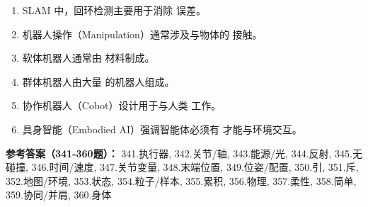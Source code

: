 \begin{enumerate}[resume,leftmargin=2em,itemsep=1pt]
\item SLAM 中，回环检测主要用于消除 \underline{\hspace{3em}} 误差。
\item 机器人操作（Manipulation）通常涉及与物体的 \underline{\hspace{3em}} 接触。
\item 软体机器人通常由 \underline{\hspace{3em}} 材料制成。
\item 群体机器人由大量 \underline{\hspace{3em}} 的机器人组成。
\item 协作机器人（Cobot）设计用于与人类 \underline{\hspace{3em}} 工作。
\item 具身智能（Embodied AI）强调智能体必须有 \underline{\hspace{3em}} 才能与环境交互。
\end{enumerate}

\textbf{参考答案（341-360题）：}
341.执行器, 342.关节/轴, 343.能源/光, 344.反射, 345.无碰撞, 346.时间/速度, 347.关节变量, 348.末端位置, 349.位姿/配置, 350.引, 351.斥, 352.地图/环境, 353.状态, 354.粒子/样本, 355.累积, 356.物理, 357.柔性, 358.简单, 359.协同/并肩, 360.身体

